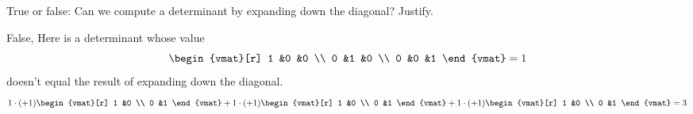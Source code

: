 
\begin{Exercise}[
name={},
title={}, 
difficulty=0,
origin={\cite{JH}}]
True or false: Can we compute a determinant by expanding down the diagonal? Justify.
\end{Exercise}
\begin{Answer}
False,
     Here is a determinant whose value
      \begin{equation*}
        \begin{vmat}[r]
          1  &0  &0  \\
          0  &1  &0  \\
          0  &0  &1
        \end{vmat}=1
      \end{equation*}
      doesn't equal the result of
      expanding down the diagonal.
      \begin{equation*}
        1\cdot (+1)\begin{vmat}[r]
               1  &0  \\
               0  &1
             \end{vmat}
       +1\cdot (+1)\begin{vmat}[r]
               1  &0  \\
               0  &1
             \end{vmat}
       +1\cdot (+1)\begin{vmat}[r]
               1  &0  \\
               0  &1
             \end{vmat}=3
      \end{equation*}  


\end{Answer}
